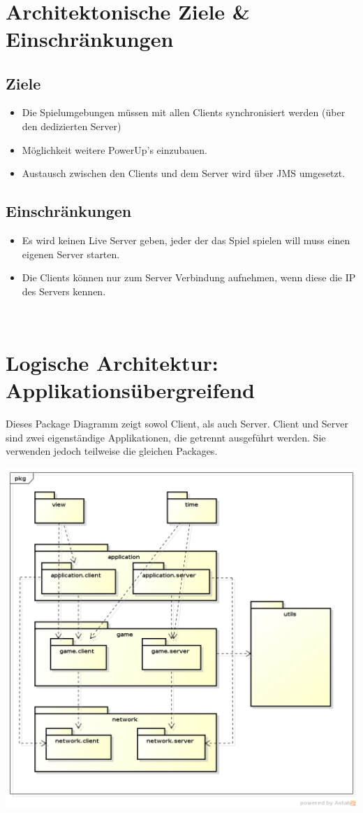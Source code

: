 \documentclass[11pt]{scrartcl}
\begin{document}
 
\section{Architektonische Ziele \& Einschränkungen}
\subsection{Ziele}
\begin{itemize}
    \item Die Spielumgebungen müssen mit allen Clients synchronisiert werden (über den dedizierten Server)
    \item Möglichkeit weitere PowerUp's einzubauen.
    \item Austausch zwischen den Clients und dem Server wird über JMS umgesetzt.
\end{itemize}


\subsection{Einschränkungen}
\begin{itemize}
    \item Es wird keinen Live Server geben, jeder der das Spiel spielen will muss einen eigenen Server starten.
    \item Die Clients können nur zum Server Verbindung aufnehmen, wenn diese die IP des Servers kennen.
\end{itemize}


\newpage
 
\section{Logische Architektur: Applikationsübergreifend}
Dieses Package Diagramm zeigt sowol Client, als auch Server. Client und Server sind zwei eigenständige Applikationen, die getrennt ausgeführt werden. Sie verwenden jedoch teilweise die gleichen Packages.

\includegraphics[scale=0.5]{LogischeSicht}
\end{document}
